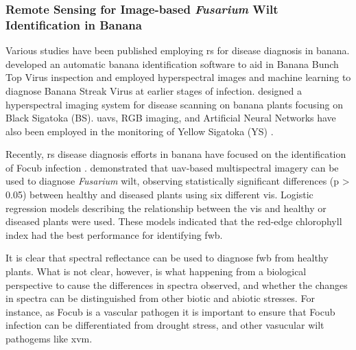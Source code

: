 \subsubsection{Remote Sensing for Image-based \textit{Fusarium} Wilt Identification in Banana}

Various studies have been published employing \ac{rs} for disease diagnosis in banana. \textcite{Johansen2014} developed an automatic banana identification software to aid in Banana Bunch Top Virus inspection and \textcite{Liao2018} employed hyperspectral images and machine learning to diagnose Banana Streak Virus at earlier stages of infection. \textcite{Ochoa2016} designed a hyperspectral imaging system for disease scanning on banana plants focusing on Black Sigatoka (BS). \acp{uav}, RGB imaging, and Artificial Neural Networks have also been employed in the monitoring of Yellow Sigatoka (YS) \parencite{Calou2020}.  

Recently, \ac{rs} disease diagnosis efforts in banana have focused on the identification of \ac{Focub} infection \parencite{Ye2020a, Ye2020b, Selvaraj2019}. \textcite{Ye2020a, Ye2020b} demonstrated that \ac{uav}-based multispectral imagery can be used to diagnose \textit{Fusarium} wilt, observing statistically significant differences (p > 0.05) between healthy and diseased plants using six different \acp{vi}. Logistic regression models describing the relationship between the \acp{vi} and healthy or diseased plants were used. These models indicated that the red-edge chlorophyll index had the best performance for identifying \ac{fwb}.  

It is clear that spectral reflectance can be used to diagnose \ac{fwb} from healthy plants. What is not clear, however, is what happening from a biological perspective to cause the differences in spectra observed, and whether the changes in spectra can be distinguished from other biotic and abiotic stresses. For instance, as \ac{Focub} is a vascular pathogen it is important to ensure that \ac{Focub} infection can be differentiated from drought stress, and other vasucular wilt pathogems like \ac{xvm}. 

